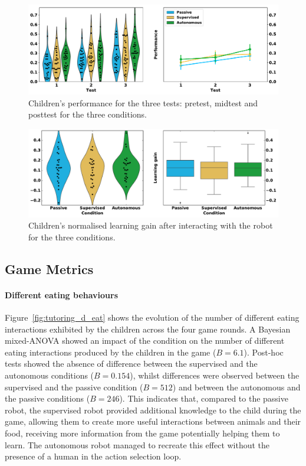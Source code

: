 \begin{figure}[ht]
	\includegraphics[width=1\linewidth]{perf.pdf}
	\centering
	\caption{Children's performance for the three tests: pretest, midtest and posttest for the three conditions.}
	\label{fig:tutoring_performance}
\end{figure}

\begin{figure}[ht]
	\includegraphics[width=1\linewidth]{learning.pdf}
	\centering
	\caption{Children's normalised learning gain after interacting with the robot for the three conditions.}
	\label{fig:tutoring_learning}
\end{figure}

\subsection{Game Metrics}

\paragraph{Different eating behaviours}
Figure~\ref{fig:tutoring_d_eat} shows the evolution of the number of different eating interactions exhibited by the children across the four game rounds. A Bayesian mixed-ANOVA showed an impact of the condition on the number of different eating interactions produced by the children in the game ($B=6.1$). Post-hoc tests showed the absence of difference between the supervised and the autonomous conditions ($B=0.154$), whilst differences were observed between the supervised and the passive condition ($B=512$) and between the autonomous and the passive conditions ($B=246$). This indicates that, compared to the passive robot, the supervised robot provided additional knowledge to the child during the game, allowing them to create more useful interactions between animals and their food, receiving more information from the game potentially helping them to learn. The autonomous robot managed to recreate this effect without the presence of a human in the action selection loop.

